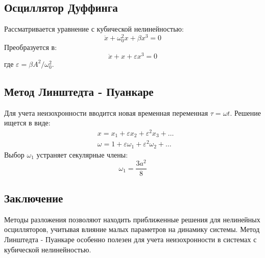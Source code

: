 \documentclass[10pt]{article}
\begin{document}
\subsection*{Осциллятор Дуффинга}
Рассматривается уравнение с кубической нелинейностью:
\begin{equation*}
\ddot{x}+\omega_{0}^{2} x+\beta x^{3}=0
\end{equation*}
Преобразуется в:
\begin{equation*}
\ddot{x}+x+\varepsilon x^{3}=0
\end{equation*}
где $\varepsilon=\beta A^{2} / \omega_{0}^{2}$.

\subsection*{Метод Линштедта - Пуанкаре}
Для учета неизохронности вводится новая временная переменная $\tau=\omega t$. Решение ищется в виде:
\begin{align*}
& x=x_{1}+\varepsilon x_{2}+\varepsilon^{2} x_{3}+\ldots \\
& \omega=1+\varepsilon \omega_{1}+\varepsilon^{2} \omega_{2}+\ldots
\end{align*}
Выбор $\omega_{1}$ устраняет секулярные члены:
\begin{equation*}
\omega_{1}=\frac{3 a^{2}}{8}
\end{equation*}

\subsection*{Заключение}
Методы разложения позволяют находить приближенные решения для нелинейных осцилляторов, учитывая влияние малых параметров на динамику системы. Метод Линштедта - Пуанкаре особенно полезен для учета неизохронности в системах с кубической нелинейностью.
\end{document}
